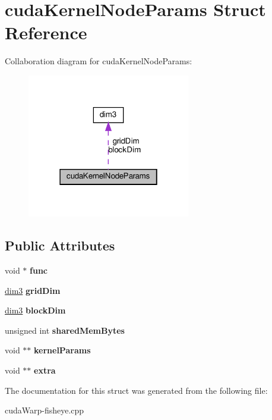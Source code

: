 \hypertarget{structcudaKernelNodeParams}{}\section{cuda\+Kernel\+Node\+Params Struct Reference}
\label{structcudaKernelNodeParams}


Collaboration diagram for cuda\+Kernel\+Node\+Params\+:\nopagebreak
\begin{figure}[H]
\begin{center}
\leavevmode
\includegraphics[width=202pt]{structcudaKernelNodeParams__coll__graph}
\end{center}
\end{figure}
\subsection*{Public Attributes}
\begin{DoxyCompactItemize}
\item 
void $\ast$ {\bfseries func}\hypertarget{structcudaKernelNodeParams_afce3df9a6ee0a768a8ca4b985558ca82}{}\label{structcudaKernelNodeParams_afce3df9a6ee0a768a8ca4b985558ca82}

\item 
\hyperlink{structdim3}{dim3} {\bfseries grid\+Dim}\hypertarget{structcudaKernelNodeParams_af31836451650cb520658bb2a741c0795}{}\label{structcudaKernelNodeParams_af31836451650cb520658bb2a741c0795}

\item 
\hyperlink{structdim3}{dim3} {\bfseries block\+Dim}\hypertarget{structcudaKernelNodeParams_a8df7b04e23379ff141831f28a860f4ae}{}\label{structcudaKernelNodeParams_a8df7b04e23379ff141831f28a860f4ae}

\item 
unsigned int {\bfseries shared\+Mem\+Bytes}\hypertarget{structcudaKernelNodeParams_a6a5412c4983da848deda394309f6f6ed}{}\label{structcudaKernelNodeParams_a6a5412c4983da848deda394309f6f6ed}

\item 
void $\ast$$\ast$ {\bfseries kernel\+Params}\hypertarget{structcudaKernelNodeParams_aa31f5e45ef1c1cfd1d97d21d2217fadd}{}\label{structcudaKernelNodeParams_aa31f5e45ef1c1cfd1d97d21d2217fadd}

\item 
void $\ast$$\ast$ {\bfseries extra}\hypertarget{structcudaKernelNodeParams_a59eb4acdd722e24ceaf670bd2d81e872}{}\label{structcudaKernelNodeParams_a59eb4acdd722e24ceaf670bd2d81e872}

\end{DoxyCompactItemize}


The documentation for this struct was generated from the following file\+:\begin{DoxyCompactItemize}
\item 
cuda\+Warp-\/fisheye.\+cpp\end{DoxyCompactItemize}
